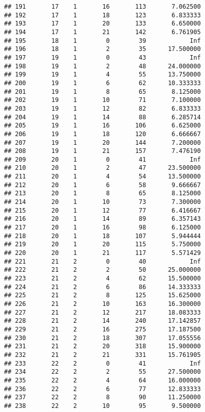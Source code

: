 \documentclass[
]{article}
\begin{document}
\begin{verbatim}
## 191       17    1       16       113       7.062500
## 192       17    1       18       123       6.833333
## 193       17    1       20       133       6.650000
## 194       17    1       21       142       6.761905
## 195       18    1        0        39            Inf
## 196       18    1        2        35      17.500000
## 197       19    1        0        43            Inf
## 198       19    1        2        48      24.000000
## 199       19    1        4        55      13.750000
## 200       19    1        6        62      10.333333
## 201       19    1        8        65       8.125000
## 202       19    1       10        71       7.100000
## 203       19    1       12        82       6.833333
## 204       19    1       14        88       6.285714
## 205       19    1       16       106       6.625000
## 206       19    1       18       120       6.666667
## 207       19    1       20       144       7.200000
## 208       19    1       21       157       7.476190
## 209       20    1        0        41            Inf
## 210       20    1        2        47      23.500000
## 211       20    1        4        54      13.500000
## 212       20    1        6        58       9.666667
## 213       20    1        8        65       8.125000
## 214       20    1       10        73       7.300000
## 215       20    1       12        77       6.416667
## 216       20    1       14        89       6.357143
## 217       20    1       16        98       6.125000
## 218       20    1       18       107       5.944444
## 219       20    1       20       115       5.750000
## 220       20    1       21       117       5.571429
## 221       21    2        0        40            Inf
## 222       21    2        2        50      25.000000
## 223       21    2        4        62      15.500000
## 224       21    2        6        86      14.333333
## 225       21    2        8       125      15.625000
## 226       21    2       10       163      16.300000
## 227       21    2       12       217      18.083333
## 228       21    2       14       240      17.142857
## 229       21    2       16       275      17.187500
## 230       21    2       18       307      17.055556
## 231       21    2       20       318      15.900000
## 232       21    2       21       331      15.761905
## 233       22    2        0        41            Inf
## 234       22    2        2        55      27.500000
## 235       22    2        4        64      16.000000
## 236       22    2        6        77      12.833333
## 237       22    2        8        90      11.250000
## 238       22    2       10        95       9.500000

\end{verbatim}
\end{document}
